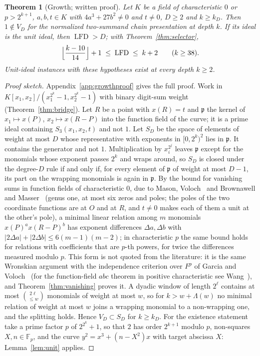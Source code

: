 \documentclass[11pt]{article}
\newtheorem{theorem}{Theorem}
\theoremstyle{definition}\newtheorem{definition}[theorem]{Definition}
\theoremstyle{remark}\newtheorem{remark}[theorem]{Remark}
\newcommand{\F}{\mathbb F}
\newcommand{\lfd}{\operatorname{LFD}}
\begin{document}
\begin{theorem}[Growth; written proof]\label{thm:growth}
Let $K$ be a field of characteristic $0$ or $p>2^{k+1}$, $a,b,t\in K$ with
$4a^3+27b^2\ne0$ and $t\ne0$, $D\ge2$ and $k\ge k_D$. Then $1\notin V_D$ for
the normalized two-summand chain presentation at depth $k$. If its ideal is
the unit ideal, then $\lfd>D$; with Theorem~\ref{thm:selector},
\[
\Bigl\lfloor\frac{k-10}{14}\Bigr\rfloor+1\;\le\;\lfd\;\le\;k+2\qquad(k\ge38).
\]
Unit-ideal instances with these hypotheses exist at every depth $k\ge2$.
\end{theorem}
\begin{proof}[Proof sketch]
Appendix~\ref{app:growthproof} gives the full proof. Work in $K[x_1,x_2]/(x_1^{2^k}-1,x_2^{2^k}-1)$ with binary digit-sum weight
(Theorem~\ref{thm:bridge}). Let $R$ be a point with $x(R)=t$ and
$\mathfrak p$ the kernel of $x_1\mapsto x(P)$, $x_2\mapsto x(R-P)$ into the
function field of the curve; it is a prime ideal containing
$S_3(x_1,x_2,t)$ and not $1$. Let $S_D$ be the space of elements of weight
at most $D$ whose representative with exponents in $[0,2^k)^2$ lies in
$\mathfrak p$. It contains the generator and not $1$. Multiplication by
$x_i^{2^j}$ leaves $\mathfrak p$ except for the monomials whose exponent
passes $2^k$ and wraps around, so $S_D$ is closed under the degree-$D$ rule
if and only if, for every element of $\mathfrak p$ of weight at most $D-1$,
its part on the wrapping monomials is again in $\mathfrak p$. By the
bound for vanishing sums in function fields of characteristic $0$, due to
Mason, Voloch~\cite[Theorem~4]{voloch85} and Brownawell and
Masser~\cite{bm86} (genus one, at most six zeros and poles; the poles of the
two coordinate functions are at $O$ and at $R$, and $t\ne0$ makes each of
them a unit at the other's pole), a minimal linear relation among $m$
monomials $x(P)^{a}x(R-P)^{b}$ has exponent differences $\Delta a,\Delta b$
with $|2\Delta a|+|2\Delta b|\le6(m-1)(m-2)$; in characteristic $p$ the same bound holds for relations
with coefficients that are $p$-th powers, for twice the differences measured
modulo $p$. This form is not quoted from the literature: it is the same
Wronskian argument with the independence criterion over $F^p$ of Garcia and
Voloch~\cite{gv87} (for the function-field $abc$ theorem in positive
characteristic see Wang~\cite{wang99}), and
Theorem~\ref{thm:vanishing} proves it. A dyadic window of length
$2^\ell$ contains at most $\binom{2\ell}{\le w}$ monomials of weight at most
$w$, so for $k>w+\Lambda(w)$ no minimal relation of weight at most $w$ joins
a wrapping monomial to a non-wrapping one, and the splitting holds. Hence
$V_D\subset S_D$ for $k\ge k_D$. For the existence statement take a prime
factor $p$ of $2^{2^k}+1$, so that $2$ has order $2^{k+1}$ modulo $p$,
non-squares $X,n\in\F_p$, and the curve $y^2=x^3+(n-X^2)x$ with target
abscissa $X$: Lemma~\ref{lem:unit} applies.
\end{proof}
\end{document}
